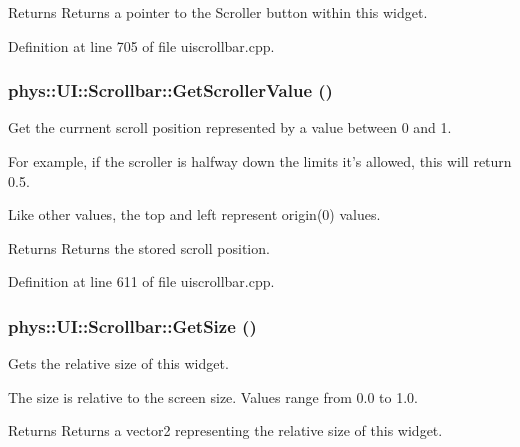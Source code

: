 \begin{DoxyReturn}{Returns}
Returns a pointer to the Scroller button within this widget. 
\end{DoxyReturn}


Definition at line 705 of file uiscrollbar.cpp.

\hypertarget{classphys_1_1UI_1_1Scrollbar_abd70ba640ef9475a77334aa209121812}{
\subsubsection[{GetScrollerValue}]{ phys::UI::Scrollbar::GetScrollerValue ()}}
\label{d0/d3e/classphys_1_1UI_1_1Scrollbar_abd70ba640ef9475a77334aa209121812}


Get the currnent scroll position represented by a value between 0 and 1. 

For example, if the scroller is halfway down the limits it's allowed, this will return 0.5. \par
 Like other values, the top and left represent origin(0) values. \begin{DoxyReturn}{Returns}
Returns the stored scroll position. 
\end{DoxyReturn}


Definition at line 611 of file uiscrollbar.cpp.

\hypertarget{classphys_1_1UI_1_1Scrollbar_aff97ce371ee21fcf3b648dcf8b38e055}{
\subsubsection[{GetSize}]{ phys::UI::Scrollbar::GetSize ()}}
\label{d0/d3e/classphys_1_1UI_1_1Scrollbar_aff97ce371ee21fcf3b648dcf8b38e055}


Gets the relative size of this widget. 

The size is relative to the screen size. Values range from 0.0 to 1.0. \begin{DoxyReturn}{Returns}
Returns a vector2 representing the relative size of this widget. 
\end{DoxyReturn}


